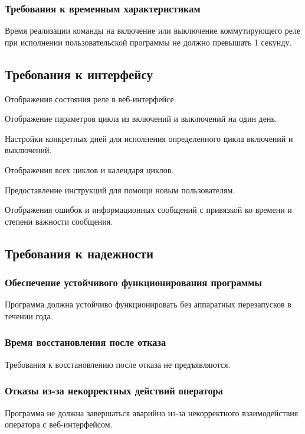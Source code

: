 \subsubsection{Требования к временным характеристикам}
Время реализации команды на включение или выключение коммутирующего реле при исполнении пользовательской программы не должно превышать 1 секунду.


\subsection{Требования к интерфейсу}
\begin{my_enumerate}
\item Отображения состояния реле в веб-интерфейсе.
\item Отображение параметров цикла из включений и выключений на один день.
\item Настройки конкретных дней для исполнения определенного цикла включений и выключений.
\item Отображения всех циклов и календаря циклов.
\item Предоставление инструкций для помощи новым пользователям.
\item Отображения ошибок и информационных сообщений с привязкой ко времени и степени важности сообщения.
\end{my_enumerate}


\subsection{Требования к надежности}
\subsubsection{Обеспечение устойчивого функционирования программы}
Программа должна устойчиво функционировать без аппаратных перезапусков в течении года.

\subsubsection{Время восстановления после отказа}
Требования к восстановлению после отказа не предъявляются.

\subsubsection{Отказы из-за некорректных действий оператора}
Программа не должна завершаться аварийно из-за некорректного взаимодействия оператора с веб-интерфейсом.


